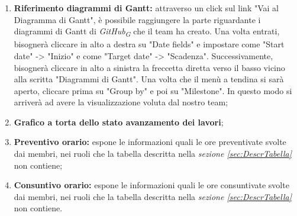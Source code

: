 \begin{enumerate}
    \item \textbf{Riferimento diagrammi di Gantt:} attraverso un click sul link "Vai al Diagramma di Gantt", è possibile raggiungere la parte riguardante i diagrammi di Gantt di \textit{GitHub}\textsubscript{\textit{G}} che il team ha creato. Una volta entrati, bisognerà cliccare in alto a destra su "Date fields" e impostare come "Start date" -> "Inizio" e come "Target date" -> "Scadenza". Successivamente, bisognerà cliccare in alto a sinistra la freccetta diretta verso il basso vicino alla scritta "Diagrammi di Gantt". Una volta che il menù a tendina si sarà aperto, cliccare prima su "Group by" e poi su "Milestone". In questo modo si arriverà ad avere la visualizzazione voluta dal nostro team;
    \item \textbf{Grafico a torta dello stato avanzamento dei lavori};
    \item \textbf{Preventivo orario:} espone le informazioni quali le ore preventivate svolte dai membri, nei ruoli che la tabella descritta nella \textit{sezione \ref{sec:DescrTabella}} non contiene; 
    \item \textbf{Consuntivo orario:} espone le informazioni quali le ore consuntivate svolte dai membri, nei ruoli che la tabella descritta nella \textit{sezione \ref{sec:DescrTabella}} non contiene. 
\end{enumerate}
